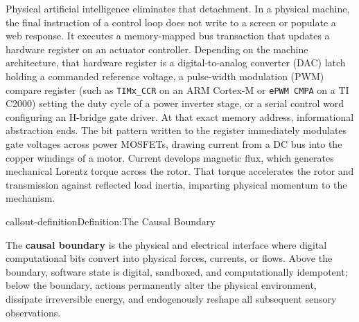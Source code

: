 \documentclass[
  10pt,
  letterpaper,
  twoside,
  openright,
  numbers=noenddot,
  headings=standardclasses
]{scrbook}
\begin{document}
Physical artificial intelligence eliminates that detachment. In a
physical machine, the final instruction of a control loop does not write
to a screen or populate a web response. It executes a memory-mapped bus
transaction that updates a hardware register on an actuator controller.
Depending on the machine architecture, that hardware register is a
digital-to-analog converter (DAC) latch holding a commanded reference
voltage, a pulse-width modulation (PWM) compare register (such as
\texttt{TIMx\_CCR} on an ARM Cortex-M or \texttt{ePWM\ CMPA} on a TI
C2000) setting the duty cycle of a power inverter stage, or a serial
control word configuring an H-bridge gate driver. At that exact memory
address, informational abstraction ends. The bit pattern written to the
register immediately modulates gate voltages across power MOSFETs,
drawing current from a DC bus into the copper windings of a motor.
Current develops magnetic flux, which generates mechanical Lorentz
torque across the rotor. That torque accelerates the rotor and
transmission against reflected load inertia, imparting physical momentum
to the mechanism.

\protect{}\label{callout-definitionux2a-1.3}
\begin{fbxSimple}{callout-definition}{Definition:}{The Causal Boundary}
\label{callout-definition*-1.3}

The \textbf{causal boundary} is the physical and electrical interface
where digital computational bits convert into physical forces, currents,
or flows. Above the boundary, software state is digital, sandboxed, and
computationally idempotent; below the boundary, actions permanently
alter the physical environment, dissipate irreversible energy, and
endogenously reshape all subsequent sensory observations.

\end{fbxSimple}
\end{document}
